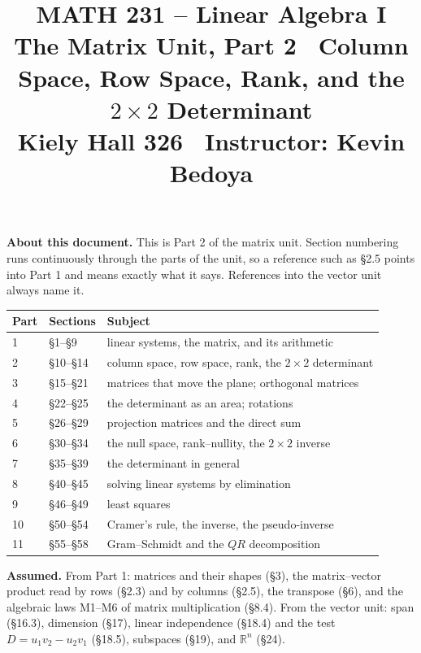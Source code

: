 \documentclass[11pt]{article}
\title{\vspace{-1.2cm}\textbf{\sffamily MATH 231 -- Linear Algebra I}\\[4pt]
       {\large\sffamily The Matrix Unit, Part 2 \textbullet\ Column Space,
        Row Space, Rank, and the $2\times2$ Determinant}\\[2pt]
       {\normalsize\sffamily Kiely Hall 326 \textbullet\
        Instructor: Kevin Bedoya}}
\author{}
\date{}
\theoremstyle{plain}
\theoremstyle{definition}
\theoremstyle{remark}
\newcommand{\R}{\mathbb{R}}
\begin{document}
\setcounter{section}{9}   %
\maketitle
\vspace{-1.6cm}

\noindent\textbf{About this document.} This is Part 2 of the matrix unit.
Section numbering runs continuously through the parts of the unit, so a
reference such as \S2.5 points into Part 1 and means exactly what it says.
References into the vector unit always name it.

\begin{center}
\renewcommand{\arraystretch}{1.15}
\small
\begin{tabular}{@{}l l l@{}}
\toprule
\textbf{Part} & \textbf{Sections} & \textbf{Subject} \\
\midrule
1  & \S1--\S9    & linear systems, the matrix, and its arithmetic \\
2  & \S10--\S14  & column space, row space, rank, the $2\times2$ determinant \\
3  & \S15--\S21  & matrices that move the plane; orthogonal matrices \\
4  & \S22--\S25  & the determinant as an area; rotations \\
5  & \S26--\S29  & projection matrices and the direct sum \\
6  & \S30--\S34  & the null space, rank--nullity, the $2\times2$ inverse \\
7  & \S35--\S39  & the determinant in general \\
8  & \S40--\S45  & solving linear systems by elimination \\
9  & \S46--\S49  & least squares \\
10 & \S50--\S54  & Cramer's rule, the inverse, the pseudo-inverse \\
11 & \S55--\S58  & Gram--Schmidt and the $QR$ decomposition \\
\bottomrule
\end{tabular}
\end{center}

\noindent\textbf{Assumed.} From Part 1: matrices and their shapes (\S3), the
matrix--vector product read by rows (\S2.3) and by columns (\S2.5), the
transpose (\S6), and the algebraic laws M1--M6 of matrix multiplication
(\S8.4). From the vector unit: span (\S16.3), dimension (\S17), linear
independence (\S18.4) and the test $D=u_1v_2-u_2v_1$ (\S18.5), subspaces
(\S19), and $\R^{n}$ (\S24).
\end{document}
